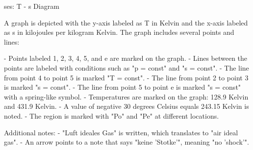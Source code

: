 ses: T - s Diagram

A graph is depicted with the y-axis labeled as T in Kelvin and the x-axis labeled as s in kilojoules per kilogram Kelvin. The graph includes several points and lines:

- Points labeled 1, 2, 3, 4, 5, and e are marked on the graph.
- Lines between the points are labeled with conditions such as "p = const" and "s = const".
- The line from point 4 to point 5 is marked "T = const".
- The line from point 2 to point 3 is marked "s = const".
- The line from point 5 to point e is marked "s = const" with a spring-like symbol.
- Temperatures are marked on the graph: 128.9 Kelvin and 431.9 Kelvin.
- A value of negative 30 degrees Celsius equals 243.15 Kelvin is noted.
- The region is marked with "Po" and "Pe" at different locations.

Additional notes:
- "Luft ideales Gas" is written, which translates to "air ideal gas".
- An arrow points to a note that says "keine 'Stotke'", meaning "no 'shock'".